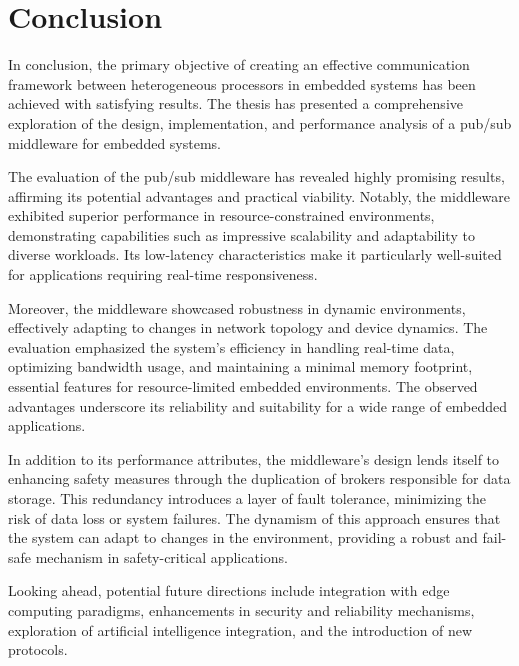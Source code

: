 

\chapter*{Conclusion}

In conclusion, the primary objective of creating an effective communication framework between heterogeneous processors in embedded systems has been achieved with satisfying results.
The thesis has presented a comprehensive exploration of the design, implementation, and performance analysis of a pub/sub middleware for embedded systems.

The evaluation of the pub/sub middleware has revealed highly promising results, affirming its potential advantages and practical viability. Notably, the middleware exhibited superior performance in resource-constrained environments, demonstrating capabilities such as impressive scalability and adaptability to diverse workloads. Its low-latency characteristics make it particularly well-suited for applications requiring real-time responsiveness.

Moreover, the middleware showcased robustness in dynamic environments, effectively adapting to changes in network topology and device dynamics. The evaluation emphasized the system's efficiency in handling real-time data, optimizing bandwidth usage, and maintaining a minimal memory footprint, essential features for resource-limited embedded environments. The observed advantages underscore its reliability and suitability for a wide range of embedded applications.

In addition to its performance attributes, the middleware's design lends itself to enhancing safety measures through the duplication of brokers responsible for data storage. This redundancy introduces a layer of fault tolerance, minimizing the risk of data loss or system failures. The dynamism of this approach ensures that the system can adapt to changes in the environment, providing a robust and fail-safe mechanism in safety-critical applications.

Looking ahead, potential future directions include integration with edge computing paradigms, enhancements in security and reliability mechanisms, exploration of artificial intelligence integration, and the introduction of new protocols.
